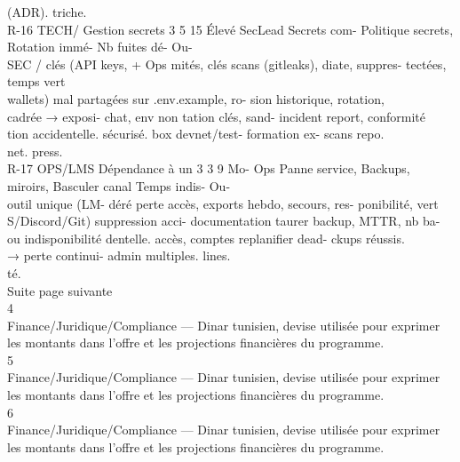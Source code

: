 (ADR).                                triche.\\
R-16       TECH/    Gestion secrets 3 5 15 Élevé SecLead Secrets   com- Politique secrets, Rotation immé- Nb fuites dé- Ou-\\
SEC      / clés (API keys,            + Ops mités,       clés scans (gitleaks), diate, suppres- tectées, temps vert\\
wallets)      mal                    partagées   sur .env.example, ro- sion historique, rotation,\\
cadrée → exposi-                     chat, env non tation clés, sand- incident report, conformité\\
tion accidentelle.                   sécurisé.       box devnet/test- formation     ex- scans repo.\\
net.              press.\\
R-17       OPS/LMS Dépendance à un 3 3 9       Mo- Ops        Panne     service, Backups, miroirs, Basculer canal Temps indis- Ou-\\
outil unique (LM-           déré           perte       accès, exports hebdo, secours,      res- ponibilité,   vert\\
S/Discord/Git)                             suppression acci- documentation taurer backup, MTTR, nb ba-\\
ou indisponibilité                         dentelle.          accès, comptes replanifier dead- ckups réussis.\\
→ perte continui-                                             admin multiples. lines.\\
té.\\
Suite page suivante\\
\vspace{0.5em}
\vspace{0.5em}
4\\
Finance/Juridique/Compliance — Dinar tunisien, devise utilisée pour exprimer les montants dans l’offre et les projections financières du programme.\\
5\\
Finance/Juridique/Compliance — Dinar tunisien, devise utilisée pour exprimer les montants dans l’offre et les projections financières du programme.\\
6\\
Finance/Juridique/Compliance — Dinar tunisien, devise utilisée pour exprimer les montants dans l’offre et les projections financières du programme.\\
\vspace{0.5em}
